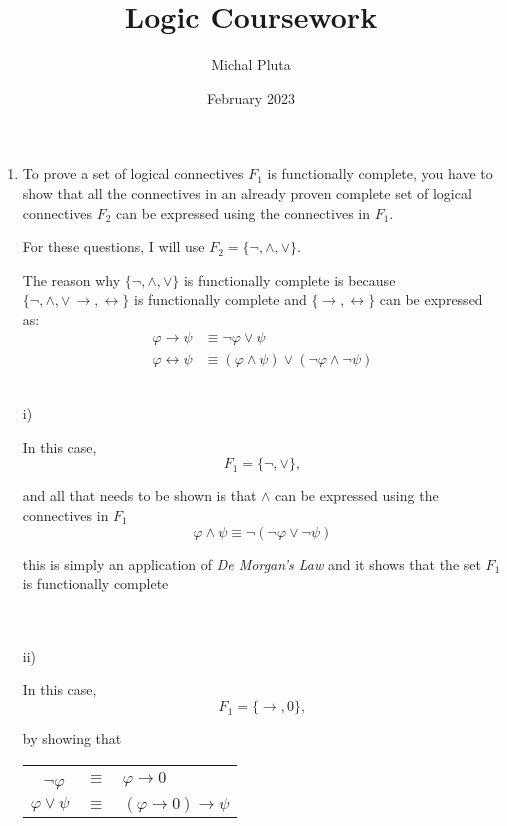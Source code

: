\documentclass{article}
\title{Logic Coursework}
\author{Michal Pluta}
\date{February 2023}
\begin{document}
\maketitle

\begin{enumerate}
    \item
    {
    To prove a set of logical connectives $F_1$ is functionally complete, you have to show that all the connectives in an already proven complete set of logical connectives $F_2$ can be expressed using the connectives in $F_1$.

    For these questions, I will use $F_2 = \{\lnot, \land, \lor\}$.

    The reason why $\{\lnot, \land, \lor\}$ is functionally complete is because $\{\lnot, \land, \lor\, \rightarrow, \leftrightarrow \}$ is functionally complete and $\{ \rightarrow, \leftrightarrow \}$ can be expressed as:
    \begin{align*}
        \varphi \rightarrow \psi &\equiv \lnot \varphi \lor \psi \\
        \varphi \leftrightarrow \psi &\equiv (\varphi \land \psi) \lor (\lnot \varphi \land \lnot \psi)
    \end{align*}
    } \\

    i) \\
    {
    In this case, 
    $$F_1 = \{\lnot, \lor\},$$
    
    and all that needs to be shown is that $\land$ can be expressed using the connectives in $F_1$
    $$\varphi \land \psi \equiv \lnot(\lnot \varphi \lor \lnot \psi)$$

    this is simply an application of \textit{De Morgan's Law} and it shows that the set $F_1$ is functionally complete
    } \\ \\

    ii) \\
    {
    In this case,
    $$F_1 = \{\rightarrow, 0\},$$

    by showing that

    \begin{center}\begin{tabular}{ccl}\
    $\lnot \varphi$ & $\equiv$ & $\varphi \rightarrow 0$ \\
    
    $\varphi \lor \psi$ & $\equiv$ & $(\varphi \rightarrow 0) \rightarrow \psi$ \\
    

\end{tabular}
\end{center}}
\end{enumerate}
\end{document}
